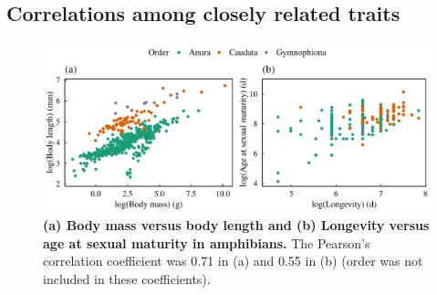 \subsection*{Correlations among closely related traits}

\begin{figure}[h!]
\centering
\includegraphics[scale=0.85]{Supporting/Chapter2/Figures/Correlations/MatLong_BMBL_amphibians}
\caption[(a) Body mass versus body length and (b) Longevity versus age at sexual maturity in amphibians.]{\textbf{(a) Body mass versus body length and (b) Longevity versus age at sexual maturity in amphibians.} The Pearson's correlation coefficient was 0.71 in (a) and 0.55 in (b) (order was not included in these coefficients).} 
\label{SI2_amphibians}
\end{figure}

